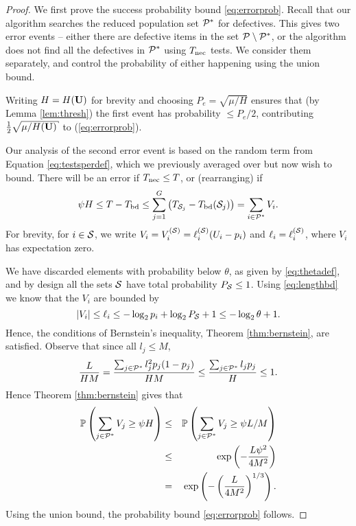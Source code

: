 \begin{proof}
We first prove the success probability bound \eqref{eq:errorprob}.
 Recall that our algorithm searches the reduced population set ${\mathcal{P}}^*$ for defectives.
This gives two  error events -- either there are defective items in the set ${\mathcal{P}} \setminus {\mathcal{P}}^*$, or the algorithm does not find all the defectives in ${\mathcal{P}}^*$ using
$T_{{\mathrm{nec}}}$ tests. We consider them separately, and control the probability of either happening using the union bound.

Writing $H = H({\mathbf{ U}})$  for brevity and
choosing $ P_e = \sqrt{ \mu/H }$ ensures that (by Lemma \ref{lem:thresh}) the first event has probability $\leq P_e/2$, contributing 
$\frac{1}{2} \sqrt{ \mu/H(\vc{U})}$ to (\ref{eq:errorprob}).


Our analysis of the second error event is based on  the 
random term   from
Equation \eqref{eq:testsperdef}, which we previously averaged over but now wish to bound. There will be an error
if $T_{{\mathrm{nec}}} \leq T$, or (rearranging) if 
$$\psi H \leq T - T_{{\mathrm{bd}}} \leq \sum_{j=1}^G \left(T_{{\mathcal{S}}_j} - T_{{\mathrm{bd}}}({\mathcal{S}}_j) \right) = \sum_{i \in {\mathcal{P}}^*} V_i.$$  For brevity,   for $i \in {\mathcal{S}}$, we write 
$V_i = V_ i^{({\mathcal{S}})} = \ell_i^{({\mathcal{S}})} (U_i - p_i)$ and $\ell_i = \ell_i^{({\mathcal{S}})}$, where $V_i$ has expectation zero. 

We have discarded elements with probability below $\theta$, as given by \eqref{eq:thetadef}, and by design all the sets ${\mathcal{S}}$ have total probability $P_{{\mathcal{S}}} \leq 1$. Using
 \eqref{eq:lengthbd} we know that the $V_i$ are bounded by
\begin{equation} | V_i|  \leq \ell_i \leq -\log_2 p_i + \log_2 P_{{\mathcal{S}}} + 1 \leq - \log_2 \theta + 1. \label{eq:vbd} \end{equation}
Hence, the conditions of Bernstein's inequality, Theorem \ref{thm:bernstein}, are satisfied. 
Observe that since all $l_j \leq M$,
$$ \frac{ L}{H M} = \frac{ \sum_{j \in {\mathcal{P}}^*} l_j^2 p_j (1-p_j)} { H M} \leq \frac{ \sum_{j \in {\mathcal{P}}^*} l_j p_j } { H} \leq 1 .$$
Hence Theorem \ref{thm:bernstein} gives that 
\begin{eqnarray*}
 {\mathbb{P}} \left( \sum_{j \in {\mathcal{P}}^*} V_j \geq \psi H \right) 
& \leq &
 {\mathbb{P}} \left( \sum_{j \in {\mathcal{P}}^*} V_j \geq \psi L/M \right) \\
& \leq &  \exp \left( - \frac{L \psi^2}{4  M^2 } \right) \\ 
& = & \exp \left( - \left( \frac{L}{4  M^2 }  \right)^{1/3}
\right).
\end{eqnarray*}
Using the union bound, the probability bound \eqref{eq:errorprob} follows.


\end{proof}
